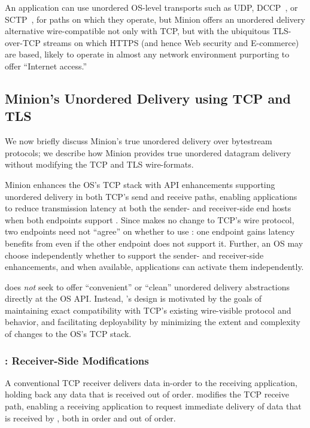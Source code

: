 An application can use unordered OS-level transports
such as UDP, DCCP~\cite{rfc4340}, or SCTP~\cite{rfc4960},
for paths on which they operate,
but Minion offers an unordered delivery alternative
wire-compatible not only with TCP,
but with the ubiquitous TLS-over-TCP streams
on which HTTPS (and hence Web security and E-commerce) are based,
likely to operate in almost any network environment
purporting to offer ``Internet access.''

\subsection{Minion's Unordered Delivery using TCP and TLS}
We now briefly discuss Minion's true unordered delivery
over bytestream protocols;
we describe how Minion provides true unordered datagram
delivery without modifying the TCP and TLS wire-formats.

Minion enhances the OS's TCP stack
with API enhancements supporting unordered delivery
in both TCP's send and receive paths,
enabling applications to reduce transmission latency
at both the sender- and receiver-side end hosts
when both endpoints support \utcp.
Since \utcp makes no change to TCP's wire protocol,
two endpoints need not ``agree'' on whether to use \utcp:
one endpoint gains latency benefits from \utcp
even if the other endpoint does not support it.
Further, an OS may choose independently
whether to support the sender- and receiver-side enhancements,
and when available, applications can activate them independently.

\utcp does {\em not} seek to offer
``convenient'' or ``clean'' unordered delivery abstractions
directly at the OS API.
Instead, \utcp's design is motivated by the goals of
maintaining exact compatibility
with TCP's existing wire-visible protocol and behavior,
and facilitating deployability
by minimizing the extent and complexity
of changes to the OS's TCP stack.

\subsubsection{\utcp: Receiver-Side Modifications}

A conventional TCP receiver delivers data in-order 
to the receiving application,
holding back any data that is received out of order.
\utcp modifies the TCP receive path,
enabling a receiving application
to request immediate delivery of data 
that is received by \utcp,
both in order and out of order.

